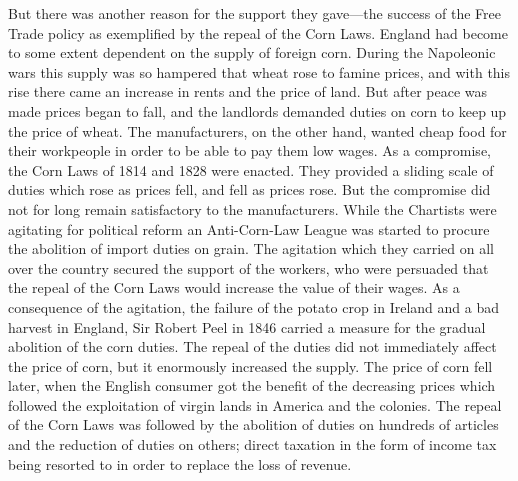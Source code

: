 \documentclass{book}
\begin{document}
But there was another reason for the support they gave—the success of the Free Trade policy as exemplified by the repeal of the Corn Laws. England had become to some extent dependent on the supply of foreign corn. During the Napoleonic wars this supply was so hampered that wheat rose to famine prices, and with this rise there came an increase in rents and the price of land. But after peace was made prices began to fall, and the landlords demanded duties on corn to keep up the price of wheat. The manufacturers, on the other hand, wanted cheap food for their workpeople in order to be able to pay them low wages. As a compromise, the Corn Laws of 1814 and 1828 were enacted. They provided a sliding scale of duties which rose as prices fell, and fell as prices rose. But the compromise did not for long remain satisfactory to the manufacturers. While the Chartists were agitating for political reform an Anti-Corn-Law League was started to procure the abolition of import duties on grain. The agitation which they carried on all over the country secured the support of the workers, who were persuaded that the repeal of the Corn Laws would increase the value of their wages. As a consequence of the agitation, the failure of the potato crop in Ireland and a bad harvest in England, Sir Robert Peel in 1846 carried a measure for the gradual abolition of the corn duties. The repeal of the duties did not immediately affect the price of corn, but it enormously increased the supply. The price of corn fell later, when the English consumer got the benefit of the decreasing prices which followed the exploitation of virgin lands in America and the colonies. The repeal of the Corn Laws was followed by the abolition of duties on hundreds of articles and the reduction of duties on others; direct taxation in the form of income tax being resorted to in order to replace the loss of revenue.
\end{document}

